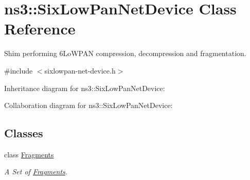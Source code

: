 \hypertarget{classns3_1_1SixLowPanNetDevice}{}\section{ns3\+:\+:Six\+Low\+Pan\+Net\+Device Class Reference}
\label{classns3_1_1SixLowPanNetDevice}


Shim performing 6\+Lo\+W\+P\+AN compression, decompression and fragmentation.  




{\ttfamily \#include $<$sixlowpan-\/net-\/device.\+h$>$}



Inheritance diagram for ns3\+:\+:Six\+Low\+Pan\+Net\+Device\+:


Collaboration diagram for ns3\+:\+:Six\+Low\+Pan\+Net\+Device\+:
\subsection*{Classes}
\begin{DoxyCompactItemize}
\item 
class \hyperlink{classns3_1_1SixLowPanNetDevice_1_1Fragments}{Fragments}
\begin{DoxyCompactList}\small\item\em A Set of \hyperlink{classns3_1_1SixLowPanNetDevice_1_1Fragments}{Fragments}. \end{DoxyCompactList}\end{DoxyCompactItemize}
